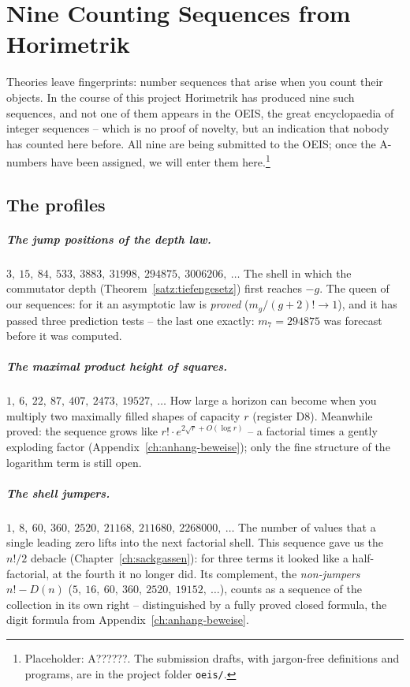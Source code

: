 \chapter{Nine Counting Sequences from Horimetrik}
\label{ch:zaehlungen}


Theories leave fingerprints: number sequences that arise when you
count their objects. In the course of this project Horimetrik has
produced nine such sequences, and not one of them appears in the
OEIS, the great encyclopaedia of integer sequences -- which is no
proof of novelty, but an indication that nobody has counted here
before. All nine are being submitted to the OEIS; once the
A-numbers have been assigned, we will enter them
here.\footnote{Placeholder: A??????. The submission drafts, with
jargon-free definitions and programs, are in the project folder
\texttt{oeis/}.}

\section{The profiles}

\paragraph{The jump positions of the depth law.}
$3,\ 15,\ 84,\ 533,\ 3883,\ 31998,\ 294875,\ 3006206,\ \ldots$
The shell in which the commutator depth
(Theorem~\ref{satz:tiefengesetz}) first reaches $-g$.
The queen of our sequences: for it an asymptotic law is
\emph{proved} ($m_g/(g+2)!\to1$), and it has passed three
prediction tests -- the last one exactly: $m_7=294875$ was
forecast before it was computed.

\paragraph{The maximal product height of squares.}
$1,\ 6,\ 22,\ 87,\ 407,\ 2473,\ 19527,\ \ldots$
How large a horizon can become when you multiply two maximally
filled shapes of capacity $r$ (register D8). Meanwhile proved: the
sequence grows like $r!\cdot e^{2\sqrt r+O(\log r)}$ -- a factorial
times a gently exploding factor (Appendix~\ref{ch:anhang-beweise});
only the fine structure of the logarithm term is still open.

\paragraph{The shell jumpers.}
$1,\ 8,\ 60,\ 360,\ 2520,\ 21168,\ 211680,\ 2268000,\ \ldots$
The number of values that a single leading zero lifts into the
next factorial shell. This sequence gave us the $n!/2$ debacle
(Chapter~\ref{ch:sackgassen}): for three terms it looked like a
half-factorial, at the fourth it no longer did. Its complement,
the \emph{non-jumpers} $n!-D(n)$
($5,\ 16,\ 60,\ 360,\ 2520,\ 19152,\ \ldots$), counts as a
sequence of the collection in its own right -- distinguished by a
fully proved closed formula, the digit formula from
Appendix~\ref{ch:anhang-beweise}.

